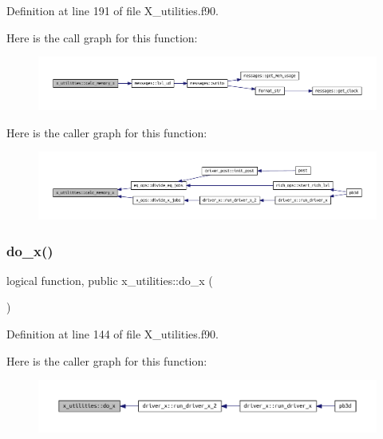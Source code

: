 Definition at line 191 of file X\+\_\+utilities.\+f90.

Here is the call graph for this function\+:
\nopagebreak
\begin{figure}[H]
\begin{center}
\leavevmode
\includegraphics[width=350pt]{namespacex__utilities_a4d18921da77463d069346f1c7322b451_cgraph}
\end{center}
\end{figure}
Here is the caller graph for this function\+:
\nopagebreak
\begin{figure}[H]
\begin{center}
\leavevmode
\includegraphics[width=350pt]{namespacex__utilities_a4d18921da77463d069346f1c7322b451_icgraph}
\end{center}
\end{figure}
\mbox{\label{namespacex__utilities_adef8eab82f0fd670a7795c754cf9a8f9}} 
\subsubsection{\texorpdfstring{do\+\_\+x()}{do\_x()}}
{\footnotesize\ttfamily logical function, public x\+\_\+utilities\+::do\+\_\+x (\begin{DoxyParamCaption}{ }\end{DoxyParamCaption})}



Definition at line 144 of file X\+\_\+utilities.\+f90.

Here is the caller graph for this function\+:
\nopagebreak
\begin{figure}[H]
\begin{center}
\leavevmode
\includegraphics[width=350pt]{namespacex__utilities_adef8eab82f0fd670a7795c754cf9a8f9_icgraph}
\end{center}
\end{figure}
\mbox{\label{namespacex__utilities_a6072ddd1fd230758795ff320c75a1f6a}} 
